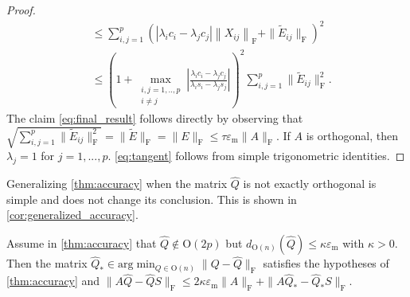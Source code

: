\documentclass[10pt,twoside,dvipsnames]{siamart1116}
\numberwithin{algorithm}{section}
\numberwithin{equation}{section}
\begin{document}
\begin{proof}
\begin{align}
	\nonumber
	&\leq \sum_{i,j=1}^p\left(|\lambda_i c_i-\lambda_j c_j|\left\|X_{ij}\right\|_\mathrm{F}+\|\widetilde{E}_{ij}\|_\mathrm{F}\right)^2\\
	\nonumber
	&\leq \left(1+\max_{\substack{i,j=1,..,p \\ i\neq j}}\left|\frac{\lambda_i c_i-\lambda_j c_j}{\lambda_i s_i-\lambda_j s_j}\right| \right)^2 \sum_{i,j=1}^p\|\widetilde{E}_{ij}\|_\mathrm{F}^2.
\end{align}
The claim \eqref{eq:final_result} follows directly by observing that $\sqrt{\sum_{i,j=1}^p\|\widetilde{E}_{ij}\|_\mathrm{F}^2}=\|\widetilde{E}\|_\mathrm{F}=\|E\|_\mathrm{F}\leq \tau \varepsilon_\mathrm{m} \|A\|_\mathrm{F}$. If $A$ is orthogonal, then $\lambda_j=1$ for $j=1,...,p$. \eqref{eq:tangent} follows from simple trigonometric identities.
\end{proof}
Generalizing \cref{thm:accuracy} when the matrix $\widehat{Q}$ is not exactly orthogonal is simple and does not change its conclusion. This is shown in \cref{cor:generalized_accuracy}.
\begin{corollary}\label{cor:generalized_accuracy}
Assume in \cref{thm:accuracy} that $\widehat{Q}\notin \mathrm{O}(2p)$ but $d_{\mathrm{O}(n)}(\widehat{Q})\leq \kappa \varepsilon_\mathrm{m} $ with $\kappa>0$. Then the matrix $\widehat{Q}_*\in \mathrm{arg}\min_{Q\in\mathrm{O}(n)}\|Q-\widehat{Q}\|_\mathrm{F}$ satisfies the hypotheses of \cref{thm:accuracy} and $\|A\widehat{Q} - \widehat{Q}S\|_\mathrm{F}\leq 2\kappa \varepsilon_\mathrm{m} \|A\|_\mathrm{F} + \|A\widehat{Q}_* - \widehat{Q}_*S\|_\mathrm{F}$.
\end{corollary}
\end{document}
